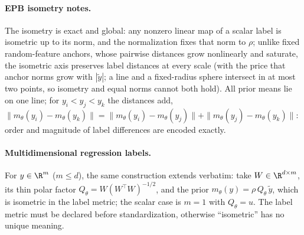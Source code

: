 \paragraph{EPB isometry notes.} The isometry is exact and global: any nonzero linear
map of a scalar label is isometric up to its norm, and the normalization fixes that
norm to $\rho$; unlike fixed random-feature anchors, whose pairwise distances grow
nonlinearly and saturate, the isometric axis preserves label distances at every scale
(with the price that anchor norms grow with $|\tilde y|$; a line and a fixed-radius
sphere intersect in at most two points, so isometry and equal norms cannot both hold).
All prior means lie on one line; for $y_i < y_j < y_k$ the distances add,
$\|m_\theta(y_i)-m_\theta(y_k)\| = \|m_\theta(y_i)-m_\theta(y_j)\| + \|m_\theta(y_j)-m_\theta(y_k)\|$:
order and magnitude of label differences are encoded exactly.

\paragraph{Multidimensional regression labels.} For $y \in \R^m$ ($m \le d$), the
same construction extends verbatim: take $W \in \R^{d \times m}$, its thin polar
factor $Q_\theta = W (W^{\top}W)^{-1/2}$, and the prior $m_\theta(y) = \rho\, Q_\theta\, \tilde y$,
which is isometric in the label metric; the scalar case is $m = 1$ with $Q_\theta = u$. The
label metric must be declared before standardization, otherwise ``isometric'' has no
unique meaning.
